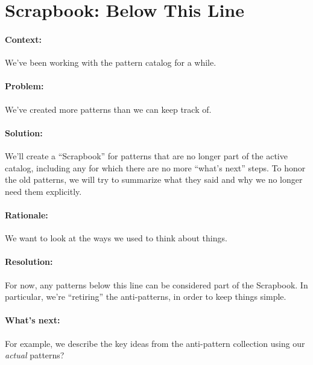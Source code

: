\section{Scrapbook: Below This Line}

\paragraph{Context:} We've been working with the pattern catalog for a while.
\paragraph{Problem:} We've created more patterns than we can keep track of.
\paragraph{Solution:} We'll create a ``Scrapbook'' for patterns that are no longer part of the active catalog, including any for which there are no more ``what's next'' steps.   To honor the old patterns, we will try to summarize what they said and why we no longer need them explicitly.
\paragraph{Rationale:} We want to look at the ways we used to think about things.
\paragraph{Resolution:} For now, any patterns below this line can be considered part of the Scrapbook.  In particular, we're ``retiring'' the anti-patterns, in order to keep things simple.
\paragraph{What's next:} For example, we describe the key ideas from the anti-pattern collection using our \emph{actual} patterns?

